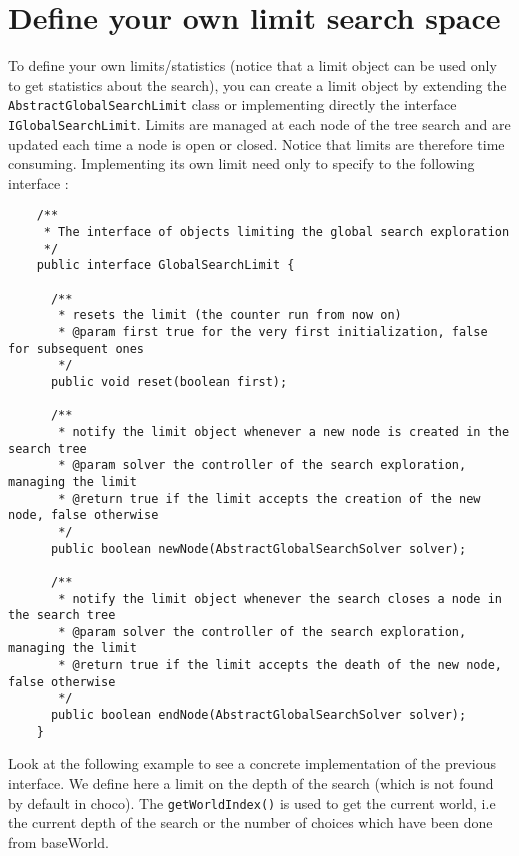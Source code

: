 \section{Define your own limit search space}\label{advanced:defineyourownlimitsearchspace}\hypertarget{advanced:defineyourownlimitsearchspace}{}

To define your own limits/statistics (notice that a limit object can be used only to get statistics about the search), you can create a limit object by extending the \texttt{AbstractGlobalSearchLimit} class or implementing directly the interface \texttt{IGlobalSearchLimit}. Limits are managed at each node of the tree search and are updated each time a node is open or closed. Notice that limits are therefore time consuming. Implementing its own limit need only to specify to the following interface :

\begin{lstlisting}
	/**
	 * The interface of objects limiting the global search exploration
	 */
	public interface GlobalSearchLimit {

	  /**
	   * resets the limit (the counter run from now on)
	   * @param first true for the very first initialization, false for subsequent ones
	   */
	  public void reset(boolean first);
	
	  /**
	   * notify the limit object whenever a new node is created in the search tree
	   * @param solver the controller of the search exploration, managing the limit
	   * @return true if the limit accepts the creation of the new node, false otherwise
	   */
	  public boolean newNode(AbstractGlobalSearchSolver solver);
	
	  /**
	   * notify the limit object whenever the search closes a node in the search tree
	   * @param solver the controller of the search exploration, managing the limit
	   * @return true if the limit accepts the death of the new node, false otherwise
	   */
	  public boolean endNode(AbstractGlobalSearchSolver solver);
	}
\end{lstlisting}

Look at the following example to see a concrete implementation of the previous interface. We define here a limit on the depth of the search (which is not found by default in choco). The \texttt{getWorldIndex()} is used to get the current world, i.e the current depth of the search or the number of choices which have been done from baseWorld. 

